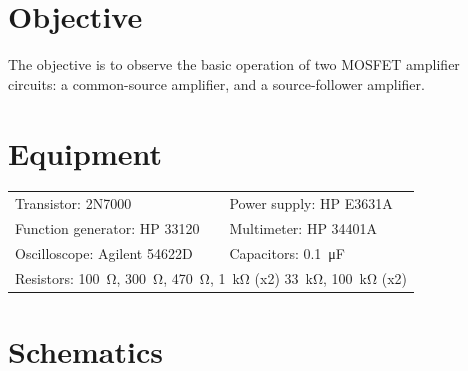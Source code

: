 

\section{Objective}
\label{sec:objective}

The objective is to observe the basic operation of two MOSFET amplifier circuits: a common-source amplifier, and a source-follower amplifier.

\section{Equipment}
\label{sec:equipment}

\begin{tabular}{ll}
  \centering
  Transistor: 2N7000           & Power supply: HP E3631A \\
  Function generator: HP 33120 & Multimeter: HP 34401A \\
  Oscilloscope: Agilent 54622D & Capacitors: \SI{0.1}{\micro\farad} \\
  \multicolumn{2}{l}{Resistors: \SI{100}{\ohm}, \SI{300}{\ohm}, \SI{470}{\ohm}, \SI{1}{\kilo\ohm} (x2) \SI{33}{\kilo\ohm}, \SI{100}{\kilo\ohm} (x2)} \\
\end{tabular}

\section{Schematics}
\label{sec:schematics}


